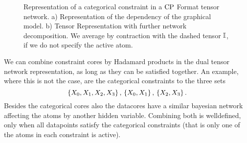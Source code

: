 



\begin{figure}[h]
\begin{center}
	
\end{center}
\caption{Representation of a categorical constraint in a $\mathrm{CP}$ Format tensor network.
	a) Representation of the dependency of the graphical model.
	b) Tensor Representation with further network decomposition.
	We average by contraction with the dashed tensor $\mathbb{I}$, if we do not specify the active atom.
	}
\label{fig:CategoricalDecomposition}
\end{figure}

\begin{remark}
	We can combine constraint cores by Hadamard products in the dual tensor network representation, as long as they can be satisfied together.
	An example, where this is not the case, are the categorical constraints to the three sets
		\[ \{X_{0},X_{1},X_{2},X_{3}\} \, , \, \{X_{0},X_{1}\}\, ,\,\{X_{2},X_{3}\} \, . \] 
	Besides the categorical cores also the datacores have a similar bayesian network affecting the atoms by another hidden variable.
	Combining both is welldefined, only when all datapoints satisfy the categorical constraints (that is only one of the atoms in each constraint is active).
\end{remark}


